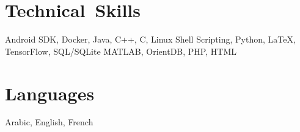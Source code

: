\section{Technical~Skills}
Android SDK, Docker, Java, C++, C, Linux Shell Scripting, Python, LaTeX, TensorFlow, SQL/SQLite
MATLAB, OrientDB, PHP, HTML
\section{Languages}
Arabic, English, French
